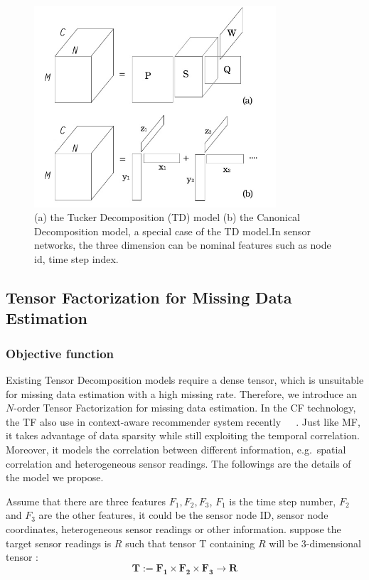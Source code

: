 \begin{figure}[h] 
\includegraphics[width=9cm]{tf.jpg} 
\caption{ (a) the Tucker Decomposition (TD) model (b) the Canonical Decomposition model, a special case of the TD model.In sensor networks, the three dimension can be nominal features such as node id, time step index.} 
\label{fig:tf:tuckcanon} 
\end{figure}

\subsection{Tensor Factorization for Missing Data Estimation} \label{sec:tfmissing}
\subsubsection{Objective function}

Existing Tensor Decomposition models require a dense tensor, which is unsuitable for missing data estimation with a high missing rate. 
Therefore, we introduce an $N$-order Tensor Factorization for missing data estimation. In the CF technology, the TF also use in context-aware recommender system recently~\cite{karatzoglou2010multiverse}~\cite{steffen2010pairwise}~\cite{zeno2010context}.
Just like MF, it takes advantage of data sparsity while still exploiting the temporal correlation.
Moreover, it models the correlation between different information, e.g.\ spatial correlation and heterogeneous sensor readings.
The followings are the details of the model we propose.

Assume that there are three features $F_1, F_2 , F_3$, $F_1$ is the time step number, $F_2$ and $F_3$ are the other features, it could be the sensor node ID, sensor node coordinates, heterogeneous sensor readings or other information.
suppose the target sensor readings is $R$ such that tensor T containing  $R$ will be 3-dimensional tensor :
\begin{equation*}
\mathbf{T} := \mathbf{F_1} \times  \mathbf{F_2} \times \mathbf{F_3} \rightarrow \mathbf{R}
\end{equation*}

